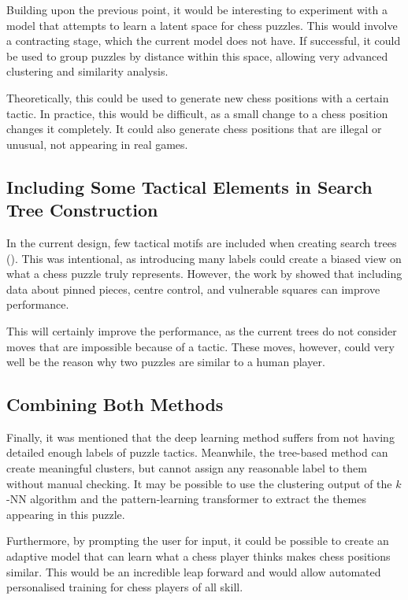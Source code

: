 Building upon the previous point, it would be interesting to experiment with a
model that attempts to learn a latent space for chess puzzles. This would
involve a contracting stage, which the current model does not have. If
successful, it could be used to group puzzles by distance within this space,
allowing very advanced clustering and similarity analysis.

Theoretically, this could be used to generate new chess positions with a
certain tactic. In practice, this would be difficult, as a small change to a
chess position changes it completely. It could also generate chess positions
that are illegal or unusual, not appearing in real games.

\subsection{Including Some Tactical Elements in Search Tree Construction}

In the current design, few tactical motifs are included when creating search
trees (). This was intentional, as introducing many labels could
create a biased view on what a chess puzzle truly represents. However, the work
by \citet{chessCNN} showed that including data about pinned pieces, centre
control, and vulnerable squares can improve performance. 

This will certainly improve the performance, as the current trees do not
consider moves that are impossible because of a tactic. These moves, however,
could very well be the reason why two puzzles are similar to a human player.

\subsection{Combining Both Methods}

Finally, it was mentioned that the deep learning method suffers from not having
detailed enough labels of puzzle tactics. Meanwhile, the tree-based method can
create meaningful clusters, but cannot assign any reasonable label to them
without manual checking. It may be possible to use the clustering output of the
$k$-NN algorithm and the pattern-learning transformer to extract the themes
appearing in this puzzle. 

Furthermore, by prompting the user for input, it could be possible to create an
adaptive model that can learn what a chess player thinks makes chess positions
similar. This would be an incredible leap forward and would allow automated
personalised training for chess players of all skill.

